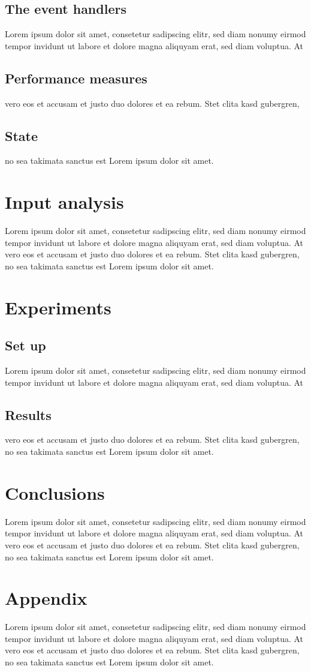 \documentclass{article}
\begin{document}
\subsection{The event handlers}
Lorem ipsum dolor sit amet, consetetur sadipscing elitr, sed diam nonumy eirmod
tempor invidunt ut labore et dolore magna aliquyam erat, sed diam voluptua. At
\subsection{Performance measures}
vero eos et accusam et justo duo dolores et ea rebum. Stet clita kasd gubergren,
\subsection{State}
no sea takimata sanctus est Lorem ipsum dolor sit amet.



\section{Input analysis}
Lorem ipsum dolor sit amet, consetetur sadipscing elitr, sed diam nonumy eirmod
tempor invidunt ut labore et dolore magna aliquyam erat, sed diam voluptua. At
vero eos et accusam et justo duo dolores et ea rebum. Stet clita kasd gubergren,
no sea takimata sanctus est Lorem ipsum dolor sit amet.


\section{Experiments}
\subsection{Set up}
Lorem ipsum dolor sit amet, consetetur sadipscing elitr, sed diam nonumy eirmod
tempor invidunt ut labore et dolore magna aliquyam erat, sed diam voluptua. At

\subsection{Results}
vero eos et accusam et justo duo dolores et ea rebum. Stet clita kasd gubergren,
no sea takimata sanctus est Lorem ipsum dolor sit amet.


\section{Conclusions}
Lorem ipsum dolor sit amet, consetetur sadipscing elitr, sed diam nonumy eirmod
tempor invidunt ut labore et dolore magna aliquyam erat, sed diam voluptua. At
vero eos et accusam et justo duo dolores et ea rebum. Stet clita kasd gubergren,
no sea takimata sanctus est Lorem ipsum dolor sit amet.


\section{Appendix}
Lorem ipsum dolor sit amet, consetetur sadipscing elitr, sed diam nonumy eirmod
tempor invidunt ut labore et dolore magna aliquyam erat, sed diam voluptua. At
vero eos et accusam et justo duo dolores et ea rebum. Stet clita kasd gubergren,
no sea takimata sanctus est Lorem ipsum dolor sit amet.
\end{document}
